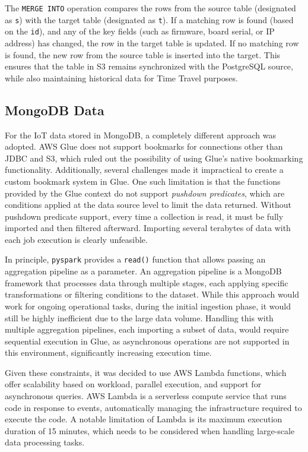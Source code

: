 The \texttt{MERGE INTO} operation compares the rows from the source table (designated as \texttt{s}) with the target table (designated as \texttt{t}). If a matching row is found (based on the \texttt{id}), and any of the key fields (such as firmware, board serial, or IP address) has changed, the row in the target table is updated. If no matching row is found, the new row from the source table is inserted into the target. This ensures that the table in S3 remains synchronized with the PostgreSQL source, while also maintaining historical data for Time Travel purposes.

\subsection{MongoDB Data}
For the IoT data stored in MongoDB, a completely different approach was adopted. AWS Glue does not support bookmarks for connections other than JDBC and S3, which ruled out the possibility of using Glue’s native bookmarking functionality. Additionally, several challenges made it impractical to create a custom bookmark system in Glue. One such limitation is that the functions provided by the Glue context do not support \textit{pushdown predicates}, which are conditions applied at the data source level to limit the data returned. Without pushdown predicate support, every time a collection is read, it must be fully imported and then filtered afterward. Importing several terabytes of data with each job execution is clearly unfeasible.

In principle, \texttt{pyspark} provides a \texttt{read()} function that allows passing an aggregation pipeline as a parameter. An aggregation pipeline is a MongoDB framework that processes data through multiple stages, each applying specific transformations or filtering conditions to the dataset. While this approach would work for ongoing operational tasks, during the initial ingestion phase, it would still be highly inefficient due to the large data volume. Handling this with multiple aggregation pipelines, each importing a subset of data, would require sequential execution in Glue, as asynchronous operations are not supported in this environment, significantly increasing execution time.

Given these constraints, it was decided to use AWS Lambda functions, which offer scalability based on workload, parallel execution, and support for asynchronous queries. AWS Lambda is a serverless compute service that runs code in response to events, automatically managing the infrastructure required to execute the code. A notable limitation of Lambda is its maximum execution duration of 15 minutes, which needs to be considered when handling large-scale data processing tasks.

